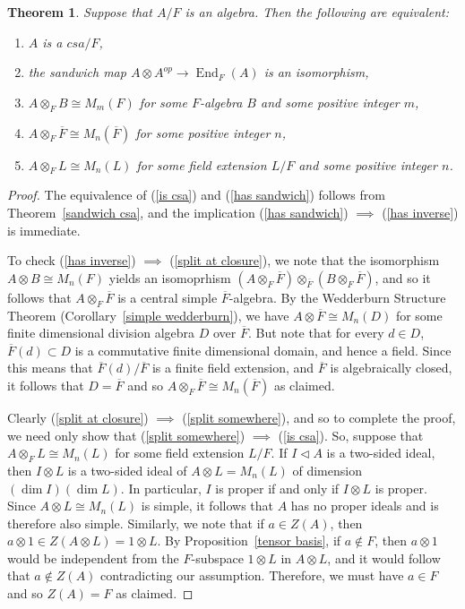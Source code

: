 \documentclass[12pt]{report}
\theoremstyle{plain}
\newtheorem{thm}{Theorem}[section]
\newcommand{\oper}[1]{\operatorname{#1}}
\newcommand{\ov}{\overline}
\newcommand{\End}{\oper{End}}
\begin{document}
\begin{thm} \label{csa equivalent}
Suppose that $A/F$ is an algebra. Then the following are equivalent:
\begin{enumerate}[1. ]
\item \label{is csa} $A$ is a $csa/F$,
\item \label{has sandwich} the sandwich map $A \otimes A^{op} \to
\End_F(A)$ is an isomorphism,
\item \label{has inverse} $A \otimes_F B \cong M_m(F)$ for some $F$-algebra
$B$ and some positive integer $m$,
\item \label{split at closure} $A \otimes_F \ov{F} \cong M_n(\ov F)$ for
some positive integer $n$,
\item \label{split somewhere} $A \otimes_F L \cong M_n(L)$ for some
field extension $L/F$ and some positive integer $n$.
\end{enumerate}
\end{thm}
\begin{proof}
The equivalence of (\ref{is csa}) and (\ref{has sandwich}) follows from
Theorem~\ref{sandwich csa}, and the implication (\ref{has sandwich})
$\implies$ (\ref{has inverse}) is immediate.

To check (\ref{has inverse}) $\implies$ (\ref{split at closure}), we note
that the isomorphism $A \otimes B \cong M_n(F)$ yields an isomoprhism
$(A \otimes_F {\ov F}) \otimes_{\ov F} (B \otimes_F {\ov F})$, and so it
follows that $A \otimes_F \ov F$ is a central simple $\ov F$-algebra. By
the Wedderburn Structure Theorem (Corollary~\ref{simple wedderburn}), we
have $A \otimes \ov F \cong M_n(D)$ for some finite dimensional division
algebra $D$ over $\ov F$. But note that for every $d \in D$, $\ov F(d) \subset
D$ is a commutative finite dimensional domain, and hence a field. Since
this means that $\ov F(d)/\ov F$ is a finite field extension, and $\ov F$
is algebraically closed, it follows that $D = \ov F$ and so $A \otimes_F
\ov F \cong M_n(\ov F)$ as claimed.

Clearly (\ref{split at closure}) $\implies$ (\ref{split somewhere}), and so
to complete the proof, we need only show that (\ref{split somewhere})
$\implies$ (\ref{is csa}). So, suppose that $A \otimes_F L \cong M_n(L)$
for some field extension $L/F$. If $I \triangleleft A$ is a two-sided
ideal, then $I \otimes L$ is a two-sided ideal of $A \otimes L  = M_n(L)$ of
dimension $(\dim I)(\dim L)$. In particular, $I$ is proper if and only if
$I \otimes L$ is proper. Since $A \otimes L \cong M_n(L)$ is simple, it
follows that $A$ has no proper ideals and is therefore also simple.
Similarly, we note that if $a \in Z(A)$, then $a \otimes 1 \in Z(A \otimes
L) = 1 \otimes L$. By Proposition~\ref{tensor basis}, if $a \not\in F$,
then $a \otimes 1$ would be independent from the $F$-subspace $1 \otimes L$
in $A \otimes L$, and it would follow that $a \not\in Z(A)$ contradicting
our assumption. Therefore, we must have $a \in F$ and so $Z(A) = F$ as
claimed.

\end{proof}
\end{document}
